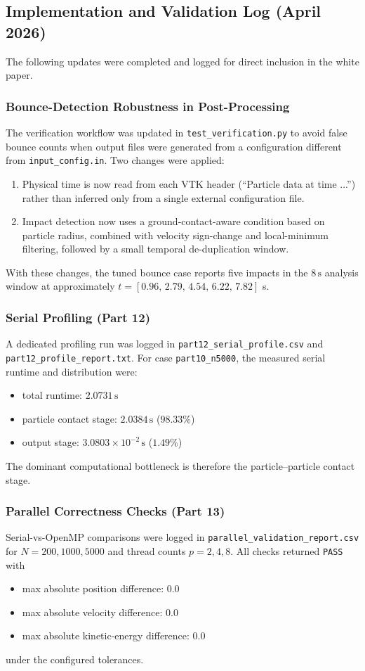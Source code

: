 \subsection{Implementation and Validation Log (April 2026)}
The following updates were completed and logged for direct inclusion in the white paper.

\subsubsection{Bounce-Detection Robustness in Post-Processing}
The verification workflow was updated in \texttt{test\_verification.py} to avoid false bounce counts when output files were generated from a configuration different from \texttt{input\_config.in}. Two changes were applied:
\begin{enumerate}
    \item Physical time is now read from each VTK header (``Particle data at time ...'') rather than inferred only from a single external configuration file.
    \item Impact detection now uses a ground-contact-aware condition based on particle radius, combined with velocity sign-change and local-minimum filtering, followed by a small temporal de-duplication window.
\end{enumerate}
With these changes, the tuned bounce case reports five impacts in the $8\,\mathrm{s}$ analysis window at approximately $t=[0.96,\,2.79,\,4.54,\,6.22,\,7.82]$ s.

\subsubsection{Serial Profiling (Part 12)}
A dedicated profiling run was logged in \texttt{part12\_serial\_profile.csv} and \texttt{part12\_profile\_report.txt}. For case \texttt{part10\_n5000}, the measured serial runtime and distribution were:
\begin{itemize}
    \item total runtime: $2.0731\,\mathrm{s}$
    \item particle contact stage: $2.0384\,\mathrm{s}$ ($98.33\%$)
    \item output stage: $3.0803\times10^{-2}\,\mathrm{s}$ ($1.49\%$)
\end{itemize}
The dominant computational bottleneck is therefore the particle--particle contact stage.

\subsubsection{Parallel Correctness Checks (Part 13)}
Serial-vs-OpenMP comparisons were logged in \texttt{parallel\_validation\_report.csv} for $N=200,1000,5000$ and thread counts $p=2,4,8$. All checks returned \texttt{PASS} with
\begin{itemize}
    \item max absolute position difference: $0.0$
    \item max absolute velocity difference: $0.0$
    \item max absolute kinetic-energy difference: $0.0$
\end{itemize}
under the configured tolerances.

